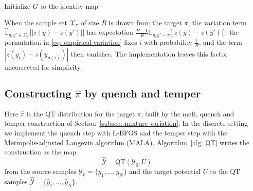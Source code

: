 \documentclass{article}
\begin{document}
\begin{algorithm}[htb]
\caption{KLXX training algorithm}
\label{alg: training}
Initialize $G$ to the identity map\;
\end{algorithm}

\begin{remark}
	When the sample set $\mathcal X_{\pi}$ of size $B$ is drawn from the target $\pi$, the variation term $\widehat{\mathbb E}_{y,y'\in \mathcal X_{\pi}} \big[|z(y)-z(y')|\big]$ has expectation $\frac{B-1}{B}\mathbb E_{y,y'\sim\pi}\big[|z(y)-z(y')|\big]$: the permutation in \eqref{eq: empirical-variation} fixes $i$ with probability $\frac1B$, and the term $|z(y_i)-z(y_{\sigma(i)})|$ then vanishes. The implementation leaves this factor uncorrected for simplicity.
\end{remark}

\subsection{Constructing \texorpdfstring{$\hat\pi$}{pi-hat} by quench and temper}
\label{subsec: QT}

Here $\hat\pi$ is the QT distribution for the target $\pi$, built by the melt, quench and temper construction of Section~\ref{subsec: mixture-variation}. In the discrete setting we implement the quench step with L-BFGS \citep{liu1989limited} and the temper step with the Metropolis-adjusted Langevin algorithm (MALA). Algorithm~\ref{alg: QT} writes the construction as the map
\begin{equation*}
    \hat{\mathcal Y} = \mathrm{QT}(\mathcal Y_0,U)
\end{equation*}
from the source samples $\mathcal Y_0=\{y_1,\dots,y_N\}$ and the target potential $U$ to the QT samples $\hat{\mathcal Y}=\{\hat y_1,\dots,\hat y_N\}$.
\end{document}
